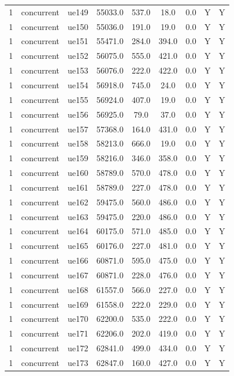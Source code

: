 \begin{table}[ht]
\begin{tabular}{|c|c|c|c|c|c|c|c|c|}
1 & concurrent & ue149 & 55033.0 & 537.0 & 18.0 & 0.0 & Y & Y \\
1 & concurrent & ue150 & 55036.0 & 191.0 & 19.0 & 0.0 & Y & Y \\
1 & concurrent & ue151 & 55471.0 & 284.0 & 394.0 & 0.0 & Y & Y \\
1 & concurrent & ue152 & 56075.0 & 555.0 & 421.0 & 0.0 & Y & Y \\
1 & concurrent & ue153 & 56076.0 & 222.0 & 422.0 & 0.0 & Y & Y \\
1 & concurrent & ue154 & 56918.0 & 745.0 & 24.0 & 0.0 & Y & Y \\
1 & concurrent & ue155 & 56924.0 & 407.0 & 19.0 & 0.0 & Y & Y \\
1 & concurrent & ue156 & 56925.0 & 79.0 & 37.0 & 0.0 & Y & Y \\
1 & concurrent & ue157 & 57368.0 & 164.0 & 431.0 & 0.0 & Y & Y \\
1 & concurrent & ue158 & 58213.0 & 666.0 & 19.0 & 0.0 & Y & Y \\
1 & concurrent & ue159 & 58216.0 & 346.0 & 358.0 & 0.0 & Y & Y \\
1 & concurrent & ue160 & 58789.0 & 570.0 & 478.0 & 0.0 & Y & Y \\
1 & concurrent & ue161 & 58789.0 & 227.0 & 478.0 & 0.0 & Y & Y \\
1 & concurrent & ue162 & 59475.0 & 560.0 & 486.0 & 0.0 & Y & Y \\
1 & concurrent & ue163 & 59475.0 & 220.0 & 486.0 & 0.0 & Y & Y \\
1 & concurrent & ue164 & 60175.0 & 571.0 & 485.0 & 0.0 & Y & Y \\
1 & concurrent & ue165 & 60176.0 & 227.0 & 481.0 & 0.0 & Y & Y \\
1 & concurrent & ue166 & 60871.0 & 595.0 & 475.0 & 0.0 & Y & Y \\
1 & concurrent & ue167 & 60871.0 & 228.0 & 476.0 & 0.0 & Y & Y \\
1 & concurrent & ue168 & 61557.0 & 566.0 & 227.0 & 0.0 & Y & Y \\
1 & concurrent & ue169 & 61558.0 & 222.0 & 229.0 & 0.0 & Y & Y \\
1 & concurrent & ue170 & 62200.0 & 535.0 & 222.0 & 0.0 & Y & Y \\
1 & concurrent & ue171 & 62206.0 & 202.0 & 419.0 & 0.0 & Y & Y \\
1 & concurrent & ue172 & 62841.0 & 499.0 & 434.0 & 0.0 & Y & Y \\
1 & concurrent & ue173 & 62847.0 & 160.0 & 427.0 & 0.0 & Y & Y \\

\end{tabular}
\end{table}

